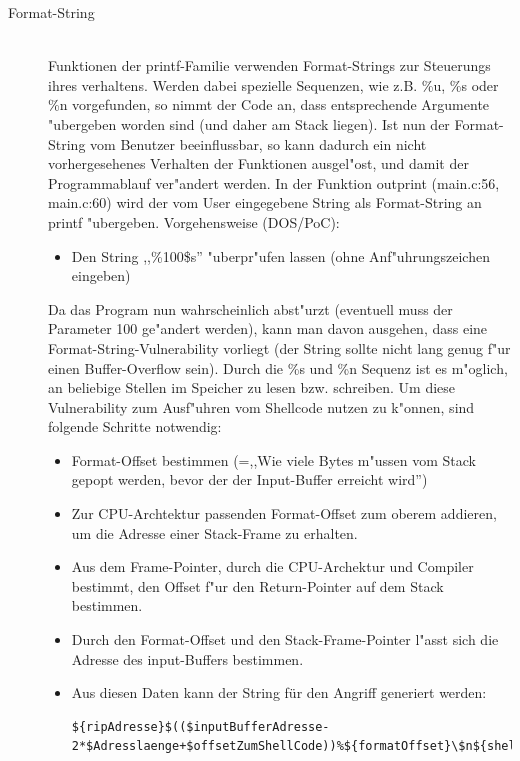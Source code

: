 \documentclass[12pt,a4paper,titlepage,oneside]{scrartcl}
\begin{document}
\begin{description}
  \item[Format-String] \hfill \\
  Funktionen der printf-Familie verwenden Format-Strings zur Steuerungs ihres verhaltens. Werden dabei spezielle Sequenzen, wie z.B. \%u, \%s oder \%n vorgefunden, so nimmt der Code an, dass entsprechende Argumente "ubergeben worden sind (und daher am Stack liegen). Ist nun der Format-String vom Benutzer beeinflussbar, so kann dadurch ein nicht vorhergesehenes Verhalten der Funktionen ausgel"ost, und damit der Programmablauf ver"andert werden.\newline
  In der Funktion outprint (main.c:56, main.c:60) wird der vom User eingegebene String als Format-String an printf "ubergeben.\newline
  Vorgehensweise (DOS/PoC):
  \begin{itemize}
  \item Den String ,,\%100\$s'' "uberpr"ufen lassen (ohne Anf"uhrungszeichen eingeben)
  \end{itemize}
  Da das Program nun wahrscheinlich abst"urzt (eventuell muss der Parameter 100 ge"andert werden), kann man davon ausgehen, dass eine Format-String-Vulnerability vorliegt (der String sollte nicht lang genug f"ur einen Buffer-Overflow sein).\newline
  Durch die \%s und \%n Sequenz ist es m"oglich, an beliebige Stellen im Speicher zu lesen bzw. schreiben.\newline
    Um diese Vulnerability zum Ausf"uhren vom Shellcode nutzen zu k"onnen, sind folgende Schritte notwendig:
    \begin{itemize}
        \item Format-Offset bestimmen (=,,Wie viele Bytes m"ussen vom Stack gepopt werden, bevor der der Input-Buffer erreicht wird'')
        \item Zur CPU-Archtektur passenden Format-Offset zum oberem addieren, um die Adresse einer Stack-Frame zu erhalten.
        \item Aus dem Frame-Pointer, durch die CPU-Archektur und Compiler bestimmt, den Offset f"ur den Return-Pointer auf dem Stack bestimmen.
        \item Durch den Format-Offset und den Stack-Frame-Pointer l"asst sich die Adresse des input-Buffers bestimmen.
        \item Aus diesen Daten kann der String für den Angriff generiert werden:\\
        \begin{lstlisting}
${ripAdresse}$(($inputBufferAdresse-2*$Adresslaenge+$offsetZumShellCode))%${formatOffset}\$n${shellCode}

\end{lstlisting}
\end{itemize}
\end{description}
\end{document}

